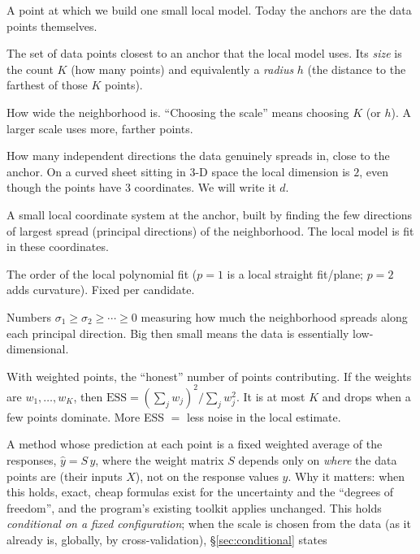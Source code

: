 \documentclass[11pt]{article}
\begin{document}
\begin{description}[leftmargin=0em,style=nextline]
\item[Anchor.] A point at which we build one small local model. Today the anchors
are the data points themselves.
\item[Neighborhood (support).] The set of data points closest to an anchor that the
local model uses. Its \emph{size} is the count $K$ (how many points) and equivalently
a \emph{radius} $h$ (the distance to the farthest of those $K$ points).
\item[Scale.] How wide the neighborhood is. ``Choosing the scale'' means choosing
$K$ (or $h$). A larger scale uses more, farther points.
\item[Local dimension.] How many independent directions the data genuinely spreads
in, close to the anchor. On a curved sheet sitting in 3-D space the local dimension
is $2$, even though the points have $3$ coordinates. We will write it $d$.
\item[Local chart.] A small local coordinate system at the anchor, built by finding
the few directions of largest spread (principal directions) of the neighborhood. The
local model is fit in these coordinates.
\item[Degree $p$.] The order of the local polynomial fit ($p=1$ is a local straight
fit/plane; $p=2$ adds curvature). Fixed per candidate.
\item[Singular values.] Numbers $\sigma_1\ge\sigma_2\ge\cdots\ge0$ measuring how much
the neighborhood spreads along each principal direction. Big then small means the
data is essentially low-dimensional.
\item[Effective sample size (ESS).] With weighted points, the ``honest'' number of
points contributing. If the weights are $w_1,\dots,w_K$, then
$\mathrm{ESS}=\left(\sum_j w_j\right)^2/\sum_j w_j^2$. It is at most $K$ and drops when
a few points dominate. More ESS $=$ less noise in the local estimate.
\item[Linear smoother.] A method whose prediction at each point is a fixed weighted
average of the responses, $\hat y = S\,y$, where the weight matrix $S$ depends only on
\emph{where} the data points are (their inputs $X$), not on the response values $y$.
Why it matters: when this holds, exact, cheap formulas exist for the uncertainty and
the ``degrees of freedom'', and the program's existing toolkit applies unchanged. This
holds \emph{conditional on a fixed configuration}; when the scale is chosen from the
data (as it already is, globally, by cross-validation), \S\ref{sec:conditional} states

\end{description}
\end{document}
